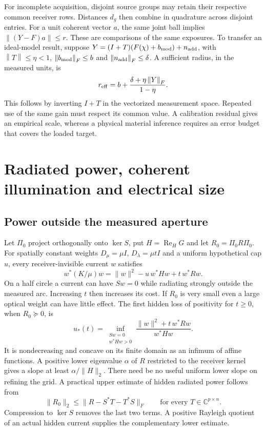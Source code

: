 \documentclass[anonymous,12pt]{iopjournal}
\newcommand{\C}{\mathbb C}\newcommand{\R}{\mathbb R}
\newcommand{\Herm}{\operatorname{Re}_{H}}\newcommand{\Imag}{\operatorname{Im}_{H}}
\newcommand{\norm}[1]{\left\|#1\right\|}\newcommand{\dd}{\mathrm d}
\numberwithin{equation}{section}
\begin{document}
For incomplete acquisition, disjoint source groups may retain their respective common receiver rows. Distances $d_g$ then combine in quadrature across disjoint entries. For a unit coherent vector $a$, the same joint ball implies $\|(Y-F)a\|\le r$. These are comparisons of the same exposures. To transfer an ideal-model result, suppose
$Y=(I+T)(F(\chi)+b_{\rm mod})+n_{\rm add}$, with
$\norm{T}\le\eta<1$, $\norm{b_{\rm mod}}_F\le b$ and $\norm{n_{\rm add}}_F\le\delta$. A sufficient radius, in the measured units, is
\begin{equation}
 r_{\rm eff}=b+\frac{\delta+\eta\norm{Y}_F}{1-\eta}.
 \label{eq:budget}
\end{equation}
This follows by inverting $I+T$ in the vectorized measurement space. Repeated use of the same gain must respect its common value. A calibration residual gives an empirical scale, whereas a physical material inference requires an error budget that covers the loaded target.

\section{Radiated power, coherent illumination and electrical size}\label{sec:single}

\subsection{Power outside the measured aperture}
Let $\Pi_0$ project orthogonally onto $\ker S$, put $H=\Herm G$ and let $R_0=\Pi_0R\Pi_0$. For spatially constant weights $D_\mu=\mu I$, $D_\lambda=\mu tI$ and a uniform hypothetical cap $u$, every receiver-invisible current $w$ satisfies
\begin{equation}
 w^*(K/\mu)w=\|w\|^2-u\,w^*Hw+t\,w^*Rw .\label{eq:dark}
\end{equation}
On a half circle a current can have $Sw=0$ while radiating strongly outside the measured arc. Increasing $t$ then increases its cost. If $R_0$ is very small even a large optical weight can have little effect. The first hidden loss of positivity for $t\ge0$, when $R_0\succeq0$, is
\begin{equation}
 u_*(t)=\inf_{\substack{Sw=0\\w^*Hw>0}}
    \frac{\|w\|^2+t\,w^*Rw}{w^*Hw}.
\end{equation}
It is nondecreasing and concave on its finite domain as an infimum of affine functions. A positive lower eigenvalue $\alpha$ of $R$ restricted to the receiver kernel gives a slope at least $\alpha/\|H\|_2$. There need be no useful uniform lower slope on refining the grid. A practical upper estimate of hidden radiated power follows from
\begin{equation}
 \|R_0\|_2\le\|R-S^*T-T^*S\|_F\qquad\text{for every }T\in\C^{p\times n}.
 \label{eq:radupper}
\end{equation}
Compression to $\ker S$ removes the last two terms. A positive Rayleigh quotient of an actual hidden current supplies the complementary lower estimate.
\end{document}
